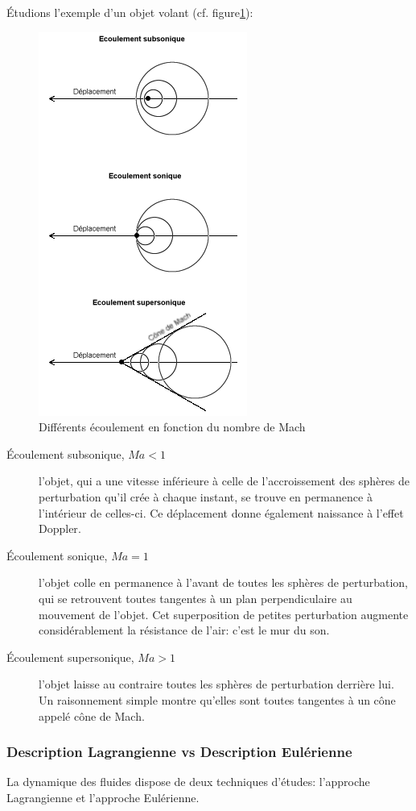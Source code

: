 \documentclass[10pt,a4paper]{article}
\begin{document}
Étudions l'exemple d'un objet volant (cf. figure\ref{fig:ecoulementmach}):
\begin{figure}
\centering
\includegraphics[scale=0.5]{ecoulementmach}
\caption{Différents écoulement en fonction du nombre de Mach}
\label{fig:ecoulementmach}
\end{figure}
\begin{description}
\item[Écoulement subsonique, $Ma<1$] l'objet, qui a une vitesse inférieure à celle de l'accroissement des sphères de perturbation qu'il crée à chaque instant, se trouve en permanence à l'intérieur de celles-ci. Ce déplacement donne également naissance à l'effet Doppler\cite{effetdoppler}.
\item[Écoulement sonique, $Ma=1$] l'objet colle en permanence à l'avant de toutes les sphères de perturbation, qui se retrouvent toutes tangentes à un plan perpendiculaire au mouvement de l'objet. Cet superposition de petites perturbation augmente considérablement la résistance de l'air: c'est le mur du son.
\item[Écoulement supersonique, $Ma>1$] l'objet laisse au contraire toutes les sphères de perturbation derrière lui. Un raisonnement simple montre qu'elles sont toutes tangentes à un cône appelé cône de Mach.
\end{description}

\subsubsection{Description Lagrangienne vs Description Eulérienne}
La dynamique des fluides dispose de deux techniques d'études: l'approche Lagrangienne et l'approche Eulérienne.
\end{document}
